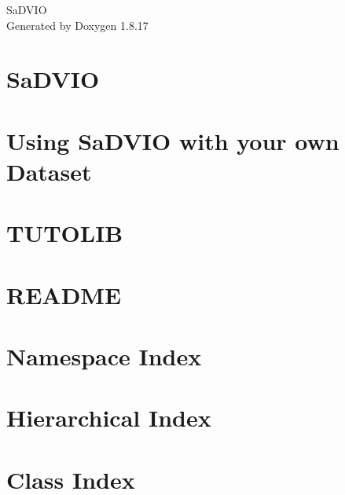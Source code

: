 \let\mypdfximage\pdfximage\def\pdfximage{\immediate\mypdfximage}\documentclass[twoside]{book}
\newcommand{\+}{\discretionary{\mbox{\scriptsize$\hookleftarrow$}}{}{}}
\newcommand{\clearemptydoublepage}{%
  \newpage{\pagestyle{empty}\cleardoublepage}%
}
\begin{document}
\hypersetup{pageanchor=false,
             bookmarksnumbered=true,
             pdfencoding=unicode
            }
\begin{titlepage}
\vspace*{7cm}
\begin{center}%
{\Large Sa\+D\+V\+IO }\\
\vspace*{1cm}
{\large Generated by Doxygen 1.8.17}\\
\end{center}
\end{titlepage}
\clearemptydoublepage
{}
\tableofcontents
\clearemptydoublepage
{}
\hypersetup{pageanchor=true}

\chapter{Sa\+D\+V\+IO}
\label{index}\hypertarget{index}{}
\chapter{Using Sa\+D\+V\+IO with your own Dataset}
\label{md__t_u_t_o}

\chapter{T\+U\+T\+O\+L\+IB}
\label{md__t_u_t_o_l_i_b}

\chapter{R\+E\+A\+D\+ME}
\label{md__home_deos_ce_8debeunne_colcon_ws_src__sa_d_v_i_o_cpp_thirdparty__e_l_s_e_d__r_e_a_d_m_e}

\chapter{Namespace Index}

\chapter{Hierarchical Index}

\chapter{Class Index}

\end{document}
